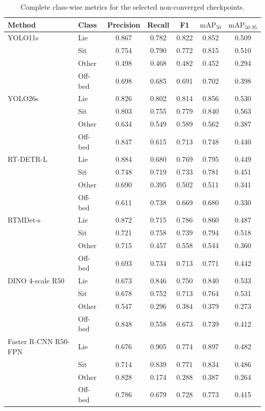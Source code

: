 \begin{table}[t]
\centering
\caption{Complete class-wise metrics for the selected non-converged checkpoints.}
\label{tab:ir_detection_early_per_class}
\scriptsize
\setlength{\tabcolsep}{5pt}
\renewcommand{\arraystretch}{1.05}
\begin{tabular}{llccccc}
\toprule
Method & Class & Precision & Recall & F1 & $\mathrm{mAP}_{50}$ & $\mathrm{mAP}_{50:95}$ \\
\midrule
YOLO11s & Lie & 0.867 & 0.782 & 0.822 & 0.852 & 0.509 \\
 & Sit & 0.754 & 0.790 & 0.772 & 0.815 & 0.510 \\
 & Other & 0.498 & 0.468 & 0.482 & 0.452 & 0.294 \\
 & Off-bed & 0.698 & 0.685 & 0.691 & 0.702 & 0.398 \\
\midrule
YOLO26s & Lie & 0.826 & 0.802 & 0.814 & 0.856 & 0.530 \\
 & Sit & 0.803 & 0.755 & 0.779 & 0.840 & 0.563 \\
 & Other & 0.634 & 0.549 & 0.589 & 0.562 & 0.387 \\
 & Off-bed & 0.847 & 0.615 & 0.713 & 0.748 & 0.440 \\
\midrule
RT-DETR-L & Lie & 0.884 & 0.680 & 0.769 & 0.795 & 0.449 \\
 & Sit & 0.748 & 0.719 & 0.733 & 0.781 & 0.451 \\
 & Other & 0.690 & 0.395 & 0.502 & 0.511 & 0.341 \\
 & Off-bed & 0.611 & 0.738 & 0.669 & 0.680 & 0.330 \\
\midrule
RTMDet-s & Lie & 0.872 & 0.715 & 0.786 & 0.860 & 0.487 \\
 & Sit & 0.721 & 0.758 & 0.739 & 0.794 & 0.518 \\
 & Other & 0.715 & 0.457 & 0.558 & 0.544 & 0.360 \\
 & Off-bed & 0.693 & 0.734 & 0.713 & 0.771 & 0.442 \\
\midrule
DINO 4-scale R50 & Lie & 0.673 & 0.846 & 0.750 & 0.840 & 0.533 \\
 & Sit & 0.678 & 0.752 & 0.713 & 0.764 & 0.531 \\
 & Other & 0.547 & 0.296 & 0.384 & 0.379 & 0.273 \\
 & Off-bed & 0.848 & 0.558 & 0.673 & 0.739 & 0.412 \\
\midrule
Faster R-CNN R50-FPN & Lie & 0.676 & 0.905 & 0.774 & 0.897 & 0.482 \\
 & Sit & 0.714 & 0.839 & 0.771 & 0.834 & 0.486 \\
 & Other & 0.828 & 0.174 & 0.288 & 0.387 & 0.264 \\
 & Off-bed & 0.786 & 0.679 & 0.728 & 0.773 & 0.415 \\
\bottomrule
\end{tabular}
\end{table}
